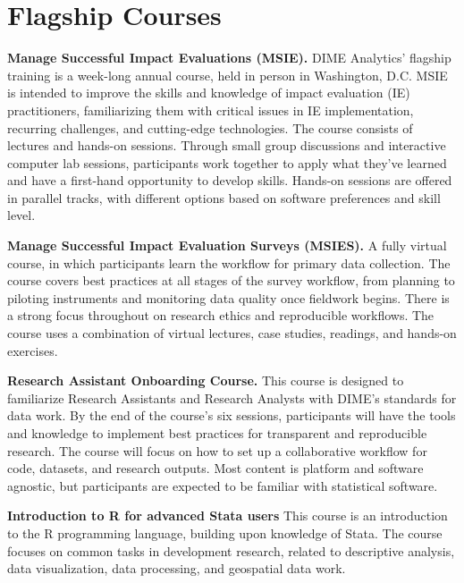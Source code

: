 
\section{Flagship Courses}

\textbf{Manage Successful Impact Evaluations (MSIE).}
DIME Analytics' flagship training is a week-long annual course,
held in person in Washington, D.C.
MSIE is intended to improve the skills and knowledge of
impact evaluation (IE) practitioners,
familiarizing them with critical issues in
IE implementation, recurring challenges,
and cutting-edge technologies.
The course consists of lectures and hands-on sessions.
Through small group discussions and interactive computer lab sessions,
participants work together to apply what they've learned
and have a first-hand opportunity to develop skills.
Hands-on sessions are offered in parallel tracks,
with different options based on software preferences and skill level.

\resourcepar\textbf{Manage Successful Impact Evaluation Surveys (MSIES).}
A fully virtual course,
in which participants learn the workflow for primary data collection.
The course covers best practices at all stages of the survey workflow,
from planning to piloting instruments
and monitoring data quality once fieldwork begins.
There is a strong focus throughout on research ethics and reproducible workflows.
The course uses a combination of virtual lectures,
case studies, readings, and hands-on exercises.

\resourcepar\textbf{Research Assistant Onboarding Course.}
This course is designed to familiarize Research Assistants and Research Analysts
with DIME's standards for data work.
By the end of the course's six sessions,
participants will have the tools and knowledge to
implement best practices for transparent and reproducible research.
The course will focus on how to set up a collaborative workflow for
code, datasets, and research outputs.
Most content is platform and software agnostic,
but participants are expected to be familiar with statistical software.

\resourcepar\textbf{Introduction to R for advanced Stata users}
This course is an introduction to the R programming language,
building upon knowledge of Stata.
The course focuses on common tasks in
development research, related to descriptive analysis,
data visualization, data processing, and geospatial data work.

